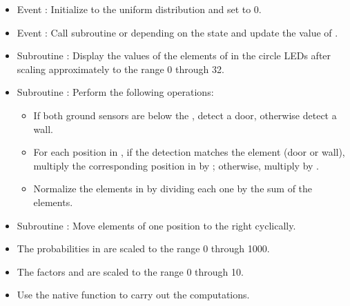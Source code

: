 
\begin{itemize}
\item Event : Initialize  to the uniform
distribution and set  to 0.

\item Event : Call subroutine  or 
depending on the state and update the value of .

\item Subroutine : Display the values of the
elements of  in the circle LEDs after scaling approximately
to the range 0 through 32.

\item Subroutine : Perform the following operations:

\begin{itemize}
\item If both ground sensors are below the , detect a door,
otherwise detect a wall.

\item For each position in , if the detection matches the
element (door or wall), multiply the corresponding position in
 by ; otherwise, multiply by .

\item Normalize the elements in  by dividing each one by
the sum of the elements.

\end{itemize}

\item Subroutine : Move elements of  one position to
the right cyclically.

\end{itemize}


\begin{itemize}

\item The probabilities in  are scaled to the range 0 through 1000.

\item The factors  and  are scaled to the range 0
through 10.

\item Use the native function  to carry out the
computations.

\end{itemize}

